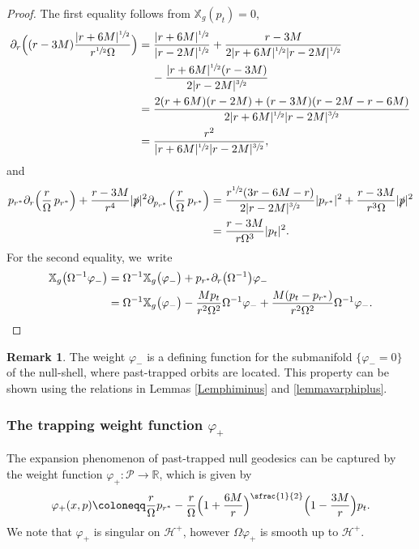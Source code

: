 \documentclass[JEP,XML,SOM,Unicode,published]{cedram}
\theoremstyle{plain}
\theoremstyle{definition}
\newtheorem{remark}[proposition]{Remark}
\newcommand\R{{\mathbb{R}}}
\newcommand\T{{\mathbb{X}}}
\begin{document}
\begin{proof}
The first equality follows from $\T_g(p_t)=0$,
\begin{align}
\partial_r \Bigl((r-3M) \frac{|r+6M|^{\sfrac{1}{2}}}{r^{\sfrac{1}{2}}\Omega} \Bigr) &= \frac{|r+6M|^{\sfrac{1}{2}}}{|r-2M|^{\sfrac{1}{2}}}+\frac{r-3M}{2|r+6M|^{\sfrac{1}{2}} |r-2M|^{\sfrac{1}{2}}} \nonumber \\
& \quad \, -\frac{|r+6M|^{\sfrac{1}{2}}(r-3M)}{2|r-2M|^{\sfrac{3}{2}}} \nonumber \\
& = \frac{2(r+6M)(r-2M)+(r-3M)(r-2M-r-6M)}{2|r+6M|^{\sfrac{1}{2}} |r-2M|^{\sfrac{3}{2}}}\label{equaequation1} \\
&=\frac{r^2}{|r+6M|^{\sfrac{1}{2}} |r-2M|^{\sfrac{3}{2}}}, \notag
\end{align}
and
\begin{align*}
p_{r^*}\partial_r \Bigl(\frac{r }{\Omega}\,p_{r^*} \Bigr)+\frac{r-3M}{r^4} |\slashed{p}|^2 \partial_{p_{r^*}} \Bigl(\frac{r }{\Omega}\,p_{r^*} \Bigr) & = \frac{r^{\sfrac{1}{2}}(3r-6M-r)}{2|r-2M|^{\sfrac{3}{2}}}|p_{r^*}|^2 +\frac{r-3M}{r^3\Omega} |\slashed{p}|^2 \\
& =\frac{r-3M}{r\Omega^3} |p_t|^2.
\end{align*}
For the second equality, we~write
\begin{equation}\label{eq:kevatalenn1}
\begin{aligned}
\T_g \bigl(\Omega^{-1} \varphi_- \bigr) & = \Omega^{-1}\T_g \bigl(\varphi_- \bigr)+p_{r^*} \partial_r \bigl(\Omega^{-1} \bigr) \varphi_- \\
& = \Omega^{-1}\T_g \bigl(\varphi_- \bigr)-\frac{Mp_t}{r^2 \Omega^2} \Omega^{-1} \varphi_- +\frac{M(p_t-p_{r^*})}{r^2 \Omega^2} \Omega^{-1} \varphi_-.
\end{aligned}\qedhere
\end{equation}
\end{proof}

\begin{remark}
The weight $\varphi_-$ is a defining function for the submanifold $\{\varphi_-=0\}$ of the null-shell, where past-trapped orbits are located. This property can be shown using the relations in Lemmas \ref{Lemphiminus} and \ref{lemmavarphiplus}.
\end{remark}

\subsubsection{The trapping weight function $\varphi_+$}
The expansion phenomenon of past-trapped null geodesics can be captured by the weight function $\varphi_{+} \colon \mathcal{P}\to \R$, which is given by\vspace*{-3pt}
\begin{equation}\label{eq:defvarphiplus}
\varphi_+ (x,p)\coloneqq\frac{r }{\Omega} p_{r^*} -\frac{r}{\Omega}\Bigl(1+\frac{6M}{r}\Bigr)^{\sfrac{1}{2}}\Bigl(1-\frac{3M}{r}\Bigr)p_t.
\end{equation}
We note that $\varphi_+$ is singular on $\mathcal{H}^+$, however $\Omega \varphi_+$ is smooth up to $\mathcal{H}^+$.
\end{document}
